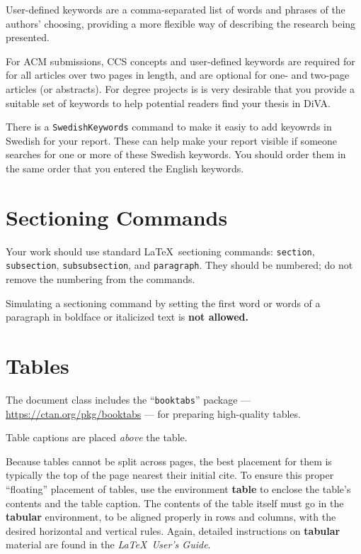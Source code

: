 \documentclass[screen, sigcconf]{timtm}
\begin{document}
User-defined keywords are a comma-separated list of words and phrases
of the authors' choosing, providing a more flexible way of describing
the research being presented.

For ACM submissions, CCS concepts and user-defined keywords are required for for all
articles over two pages in length, and are optional for one- and
two-page articles (or abstracts). For degree projects is is very desirable that you provide a suitable set of keywords to help potential readers find your thesis in DiVA.

There is a \verb|SwedishKeywords| command to make it easiy to add keyowrds in Swedish for your report. These can help make your report visible if someone searches for one or more of these Swedish keywords. You should order them in the same order that you entered the English keywords.

\section{Sectioning Commands}

Your work should use standard \LaTeX\ sectioning commands:
\verb|section|, \verb|subsection|, \verb|subsubsection|, and
\verb|paragraph|. They should be numbered; do not remove the numbering
from the commands.

Simulating a sectioning command by setting the first word or words of
a paragraph in boldface or italicized text is {\bfseries not allowed.}

\section{Tables}

The document class includes the ``\verb|booktabs|''
package --- \url{https://ctan.org/pkg/booktabs} --- for preparing
high-quality tables.

Table captions are placed {\itshape above} the table.

Because tables cannot be split across pages, the best placement for
them is typically the top of the page nearest their initial cite.  To
ensure this proper ``floating'' placement of tables, use the
environment \textbf{table} to enclose the table's contents and the
table caption.  The contents of the table itself must go in the
\textbf{tabular} environment, to be aligned properly in rows and
columns, with the desired horizontal and vertical rules.  Again,
detailed instructions on \textbf{tabular} material are found in the
\textit{\LaTeX\ User's Guide}.
\end{document}
